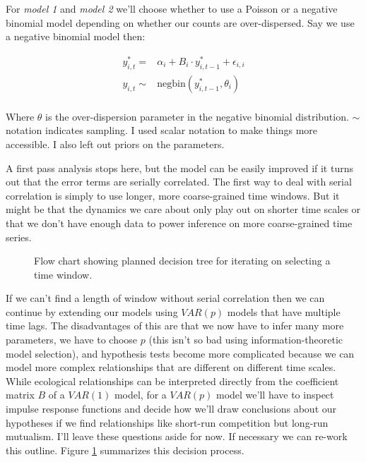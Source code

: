 \documentclass[12pt]{memoir}
\begin{document}
For \emph{model 1} and \emph{model 2} we'll choose whether to use a Poisson or a negative binomial model depending on whether our counts are over-dispersed.  Say we use a negative binomial model then:

\begin{align*}
  y^*_{i,t} = & \alpha_i + B_i \cdot y^*_{i,t-1} + \epsilon_{i,i}\\
  y_{i,t} \sim & \mathrm{negbin}(y^*_{i,t-1}, \theta_{i}) \\
\end{align*}

Where $\theta$ is the over-dispersion parameter in the negative binomial distribution.  $\sim$ notation indicates sampling. I used scalar notation to make things more accessible.  I also left out priors on the parameters.

A first pass analysis stops here, but the model can be easily improved if it turns out that the error terms are serially correlated.  The first way to deal with serial correlation is simply to use longer, more coarse-grained time windows. But it might be that the dynamics we care about only play out on shorter time scales or that we don't have enough data to power inference on more coarse-grained time series.

\begin{figure}[t]
  
  \caption{Flow chart showing planned decision tree for iterating on selecting a time window. \label{fig:analytic_plan}}
\end{figure}

If we can't find a length of window without serial correlation then we can continue by extending our models using $VAR(p)$ models that have multiple time lags. The disadvantages of this are that we now have to infer many more parameters, we have to choose $p$ (this isn't so bad using information-theoretic model selection), and hypothesis tests become more complicated because we can model more complex relationships that are different on different time scales. While ecological relationships can be interpreted directly from the coefficient matrix $B$ of a $VAR(1)$ model, for a $VAR(p)$ model we'll have to inspect impulse response functions and decide how we'll draw conclusions about our hypotheses if we find relationships like short-run competition but long-run mutualism.  I'll leave these questions aside for now.  If necessary we can re-work this outline. Figure \ref{fig:analytic_plan} summarizes this decision process.
\end{document}
